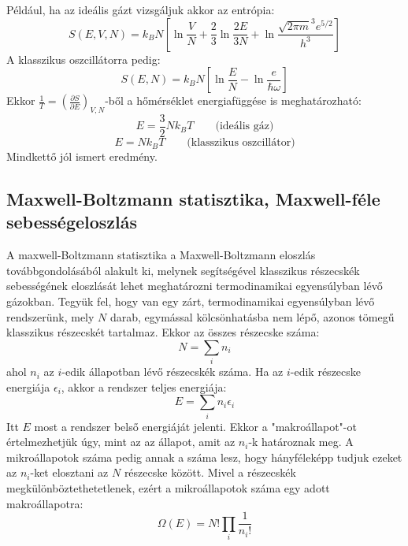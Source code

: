 \documentclass[../main.tex]{subfiles}
\begin{document}
Például, ha az ideális gázt vizsgáljuk akkor az entrópia:
\begin{equation}
    S(E, V, N) = k_B N \left[ \ln \frac{V}{N} + \frac{2}{3}\ln \frac{2E}{3N} + \ln \frac{\sqrt{2 \pi m}^3 e^{5/2}}{h^3} \right]
\end{equation}
A klasszikus oszcillátorra pedig:
\begin{equation}
    S(E, N) = k_B N \left[ \ln \frac{E}{N} - \ln \frac{e}{\hbar \omega} \right]
\end{equation}
Ekkor $\frac{1}{T} = \left(\frac{\partial S}{\partial E}\right)_{V, N}$-ből a hőmérséklet energiafüggése is meghatározható:
\begin{equation}
    E = \frac{3}{2} N k_B T \qquad \text{(ideális gáz)}
\end{equation}
\begin{equation}
    E = N k_B T \qquad \text{(klasszikus oszcillátor)}
\end{equation}
Mindkettő jól ismert eredmény.

\subsection{Maxwell-Boltzmann statisztika, Maxwell-féle sebességeloszlás}
A maxwell-Boltzmann statisztika a Maxwell-Boltzmann eloszlás továbbgondolásából alakult ki, melynek segítségével klasszikus részecskék sebességének eloszlását lehet meghatározni
termodinamikai egyensúlyban lévő gázokban. Tegyük fel, hogy van egy zárt, termodinamikai egyensúlyban lévő rendszerünk, mely $N$ darab, egymással kölcsönhatásba nem lépő, azonos tömegű klasszikus részecskét tartalmaz.
Ekkor az összes részecske száma:
\begin{equation}
    N = \sum_i n_i
\end{equation}
ahol $n_i$ az $i$-edik állapotban lévő részecskék száma. Ha az $i$-edik részecske energiája $\epsilon_i$, akkor a rendszer teljes energiája:
\begin{equation}
    E = \sum_i n_i \epsilon_i
\end{equation}
Itt $E$ most a rendszer belső energiáját jelenti. Ekkor a "makroállapot"-ot értelmezhetjük úgy, mint az az állapot, amit az $n_i$-k határoznak meg.
A mikroállapotok száma pedig annak a száma lesz, hogy hányféleképp tudjuk ezeket az $n_i$-ket elosztani az $N$ részecske között. Mivel a részecskék megkülönböztethetetlenek,
ezért a mikroállapotok száma egy adott makroállapotra:
\begin{equation}
    \Omega(E) = N! \prod_i \frac{1}{n_i!}
\end{equation}
\end{document}
